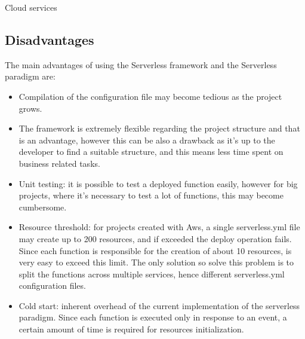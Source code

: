 \begin{chapter}{Cloud services}
    \subsection{Disadvantages}
    \label{subsec:sls_disadvantage}
    The main advantages of using the Serverless framework and the Serverless paradigm are:
    \begin{itemize}
        \item Compilation of the configuration file may become tedious as the project grows.
        \item The framework is extremely flexible regarding the project structure and
            that is an advantage, however this can be also a drawback as it's up to the
            developer to find a suitable structure, and this means less time spent on
            business related tasks.
        \item Unit testing: it is possible to test a deployed function easily, however
            for big projects, where it's necessary to test a lot of functions, this may
            become cumbersome.
        \item Resource threshold: for projects created with Aws, a single
            serverless.yml file may create up to 200 resources, and if exceeded
            the deploy operation fails. Since each function is responsible for the
            creation of about 10 resources, is very easy to exceed this limit.
            The only solution so solve this problem is to split the functions across
            multiple services, hence different serverless.yml configuration files.
        \item Cold start: inherent overhead of the current implementation of the
            serverless paradigm. Since each function is executed only in response to
            an event, a certain amount of time is required for resources initialization.
    \end{itemize}


\end{chapter}
